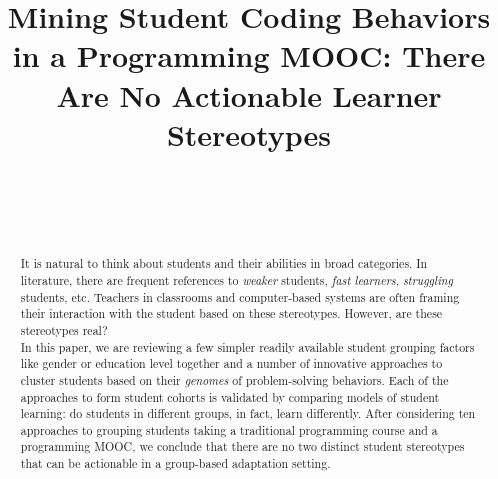 \documentclass{sigchi}
\begin{document}
\title{
Mining Student Coding Behaviors in a Programming MOOC: There Are No Actionable Learner Stereotypes}

\author{%
  \\
  \\
  \\
}

\maketitle

\begin{abstract}
It is natural to think about students and their abilities in broad categories. In literature, there are frequent references to \textit{weaker} students, \textit{fast learners}, \textit{struggling} students, etc. Teachers in classrooms and computer-based systems are often framing their interaction with the student based on these stereotypes. However, are these stereotypes real?\\
In this paper, we are reviewing a few simpler readily available student grouping factors like gender or education level together and a number of innovative approaches to cluster students based on their \textit{genomes} of problem-solving behaviors. Each of the approaches to form student cohorts is validated by comparing models of student learning: do students in different groups, in fact, learn differently. After considering ten approaches to grouping students taking a traditional programming course and a programming MOOC, we conclude that there are no two distinct student stereotypes that can be actionable in a group-based     adaptation setting.
\end{abstract}
\end{document}
